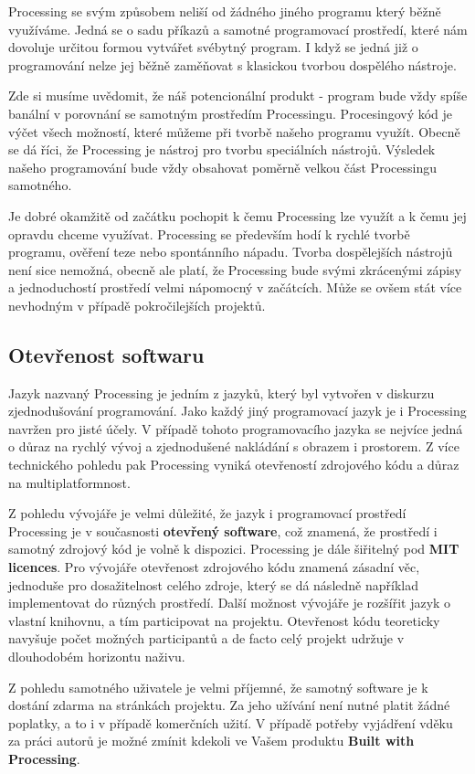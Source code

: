 \documentclass[10pt,twopage]{book}
\newcommand{\pododdil}[1]{\subsection{#1}\label{subsec:#1}}
\newcommand{\slovnik}[1]{\textbf{\gls{#1}}\index{#1}}
\newcommand{\slovnikpl}[1]{\textbf{\glspl{#1}}\index{#1}}
\begin{document}
Processing se svým způsobem neliší od žádného jiného programu který běžně využíváme. Jedná se o sadu příkazů a samotné programovací prostředí, které nám dovoluje určitou formou vytvářet svébytný program. I když se jedná již o programování nelze jej běžně zaměňovat s klasickou tvorbou dospělého nástroje.

Zde si musíme uvědomit, že náš potencionální produkt - program bude vždy spíše banální v porovnání se samotným prostředím Processingu. Procesingový kód je výčet všech možností, které můžeme při tvorbě našeho programu využít. Obecně se dá říci, že Processing je nástroj pro tvorbu speciálních nástrojů. Výsledek našeho programování bude vždy obsahovat poměrně velkou část Processingu samotného.

Je dobré okamžitě od začátku pochopit k čemu Processing lze využít a k čemu jej opravdu chceme využívat. Processing se především hodí k rychlé tvorbě programu, ověření teze nebo spontánního nápadu. Tvorba dospělejších nástrojů není sice nemožná, obecně ale platí, že Processing bude svými zkrácenými zápisy a jednoduchostí prostředí velmi nápomocný v začátcích. Může se ovšem stát více nevhodným v případě pokročilejších projektů. 


\pododdil{Otevřenost softwaru}

Jazyk nazvaný Processing je jedním z jazyků, který byl vytvořen v diskurzu zjednodušování programování. Jako každý jiný programovací jazyk je i Processing navržen pro jisté účely. V případě tohoto programovacího jazyka se nejvíce jedná o důraz na rychlý vývoj a zjednodušené nakládání s obrazem i prostorem. Z více technického pohledu pak Processing vyniká otevřeností zdrojového kódu a důraz na multiplatformnost.

Z pohledu vývojáře je velmi důležité, že jazyk i programovací prostředí Processing je v současnosti \slovnik{otevřený software}, což znamená, že prostředí i samotný zdrojový kód je volně k dispozici. Processing je dále šiřitelný pod \slovnikpl{MIT licence}. Pro vývojáře otevřenost zdrojového kódu znamená zásadní věc, jednoduše pro dosažitelnost celého zdroje, který se dá následně například implementovat do různých prostředí. Další možnost vývojáře je rozšířit jazyk o vlastní knihovnu, a tím participovat na projektu. Otevřenost kódu teoreticky navyšuje počet možných participantů a de facto celý projekt udržuje v dlouhodobém horizontu naživu.

Z pohledu samotného uživatele je velmi příjemné, že samotný software je k dostání zdarma na stránkách projektu. Za jeho užívání není nutné platit žádné poplatky, a to i v případě komerčních užití. V případě potřeby vyjádření vděku za práci autorů je možné zmínit kdekoli ve Vašem produktu \slovnik{Built with Processing}.
\end{document}
